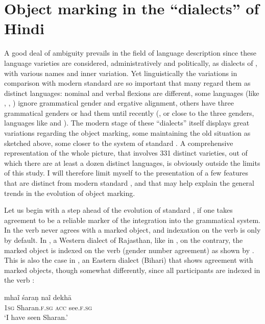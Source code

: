 \documentclass[output=paper]{LSP/langsci}
\begin{document}
\section{Object marking in the “dialects” of Hindi}
\label{10-mo-sec:5}

A good deal of ambiguity prevails in the field of language description since these language varieties are considered, administratively and politically, as dialects of , with various names and inner variation. Yet linguistically the variations in comparison with modern standard  are so important that many regard them as distinct languages: nominal and verbal flexions are different, some languages (like , , ) ignore grammatical gender and ergative alignment, others have three grammatical genders or had them until recently (, or close to the three genders, languages like  and ). The modern stage of these “dialects” itself displays great variations regarding the object marking, some maintaining the old situation as sketched above, some closer to the system of standard . A comprehensive representation of the whole picture, that involves 331 distinct varieties, out of which there are at least a dozen distinct languages, is obviously outside the limits of this study. I will therefore limit myself to the presentation of a few features that are distinct from modern standard , and that may help explain the general trends in the evolution of object marking. 

Let us begin with a step ahead of the evolution of standard , if one takes agreement to be a reliable marker of the integration into the grammatical system. In  the verb never agrees with a marked object, and indexation on the verb is only by default. In , a Western dialect of Rajasthan, like in , on the contrary, the marked object is indexed on the verb (gender number agreement) as shown by . This is also the case in , an Eastern dialect (Bihari) that shows agreement with marked objects, though somewhat differently, since all  participants are indexed in the verb :


\ea {} \citep{Khokholova2001Ergativity}

\label{10-mo-ex:46}
\gll mhaĩ śaraṇ naĩ dekhā\\
\textsc{1sg} Sharan.\textsc{f.sg} \textsc{acc} see.\textsc{f.sg}\\
\glt ‘I have seen Sharan.’ 
\z
\end{document}
